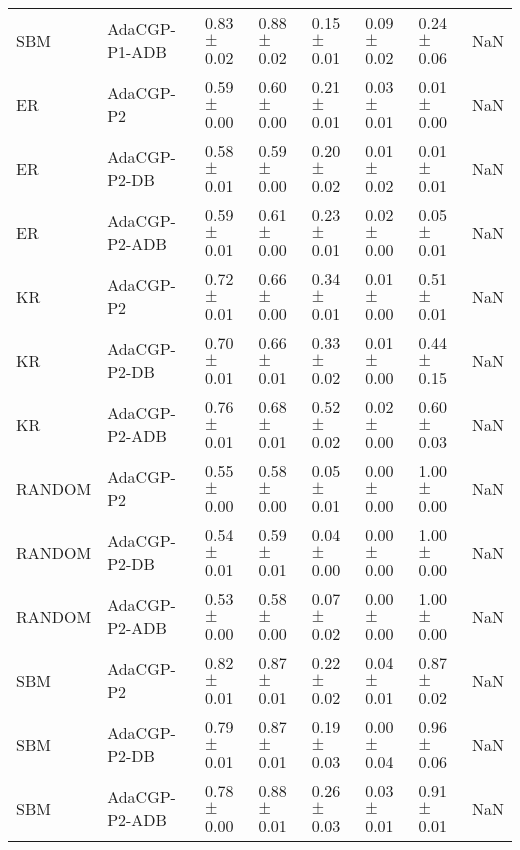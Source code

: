\begin{tabular}{lllllllr}
SBM & AdaCGP-P1-ADB & 0.83{\scriptsize$\pm$0.02} & 0.88{\scriptsize$\pm$0.02} & 0.15{\scriptsize$\pm$0.01} & 0.09{\scriptsize$\pm$0.02} & 0.24{\scriptsize$\pm$0.06} & NaN \\
ER & AdaCGP-P2 & 0.59{\scriptsize$\pm$0.00} & 0.60{\scriptsize$\pm$0.00} & 0.21{\scriptsize$\pm$0.01} & 0.03{\scriptsize$\pm$0.01} & 0.01{\scriptsize$\pm$0.00} & NaN \\
ER & AdaCGP-P2-DB & 0.58{\scriptsize$\pm$0.01} & 0.59{\scriptsize$\pm$0.00} & 0.20{\scriptsize$\pm$0.02} & 0.01{\scriptsize$\pm$0.02} & 0.01{\scriptsize$\pm$0.01} & NaN \\
ER & AdaCGP-P2-ADB & 0.59{\scriptsize$\pm$0.01} & 0.61{\scriptsize$\pm$0.00} & 0.23{\scriptsize$\pm$0.01} & 0.02{\scriptsize$\pm$0.00} & 0.05{\scriptsize$\pm$0.01} & NaN \\
KR & AdaCGP-P2 & 0.72{\scriptsize$\pm$0.01} & 0.66{\scriptsize$\pm$0.00} & 0.34{\scriptsize$\pm$0.01} & 0.01{\scriptsize$\pm$0.00} & 0.51{\scriptsize$\pm$0.01} & NaN \\
KR & AdaCGP-P2-DB & 0.70{\scriptsize$\pm$0.01} & 0.66{\scriptsize$\pm$0.01} & 0.33{\scriptsize$\pm$0.02} & 0.01{\scriptsize$\pm$0.00} & 0.44{\scriptsize$\pm$0.15} & NaN \\
KR & AdaCGP-P2-ADB & 0.76{\scriptsize$\pm$0.01} & 0.68{\scriptsize$\pm$0.01} & 0.52{\scriptsize$\pm$0.02} & 0.02{\scriptsize$\pm$0.00} & 0.60{\scriptsize$\pm$0.03} & NaN \\
RANDOM & AdaCGP-P2 & 0.55{\scriptsize$\pm$0.00} & 0.58{\scriptsize$\pm$0.00} & 0.05{\scriptsize$\pm$0.01} & 0.00{\scriptsize$\pm$0.00} & 1.00{\scriptsize$\pm$0.00} & NaN \\
RANDOM & AdaCGP-P2-DB & 0.54{\scriptsize$\pm$0.01} & 0.59{\scriptsize$\pm$0.01} & 0.04{\scriptsize$\pm$0.00} & 0.00{\scriptsize$\pm$0.00} & 1.00{\scriptsize$\pm$0.00} & NaN \\
RANDOM & AdaCGP-P2-ADB & 0.53{\scriptsize$\pm$0.00} & 0.58{\scriptsize$\pm$0.00} & 0.07{\scriptsize$\pm$0.02} & 0.00{\scriptsize$\pm$0.00} & 1.00{\scriptsize$\pm$0.00} & NaN \\
SBM & AdaCGP-P2 & 0.82{\scriptsize$\pm$0.01} & 0.87{\scriptsize$\pm$0.01} & 0.22{\scriptsize$\pm$0.02} & 0.04{\scriptsize$\pm$0.01} & 0.87{\scriptsize$\pm$0.02} & NaN \\
SBM & AdaCGP-P2-DB & 0.79{\scriptsize$\pm$0.01} & 0.87{\scriptsize$\pm$0.01} & 0.19{\scriptsize$\pm$0.03} & 0.00{\scriptsize$\pm$0.04} & 0.96{\scriptsize$\pm$0.06} & NaN \\
SBM & AdaCGP-P2-ADB & 0.78{\scriptsize$\pm$0.00} & 0.88{\scriptsize$\pm$0.01} & 0.26{\scriptsize$\pm$0.03} & 0.03{\scriptsize$\pm$0.01} & 0.91{\scriptsize$\pm$0.01} & NaN \\

\end{tabular}
